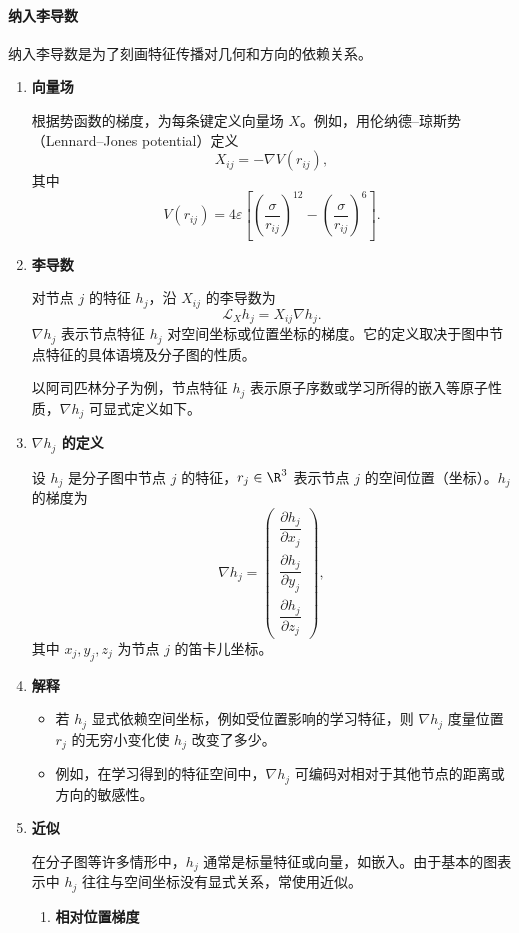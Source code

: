 \paragraph{纳入李导数}
纳入李导数是为了刻画特征传播对几何和方向的依赖关系。
\begin{enumerate}[label=\alph*.]
  \item \textbf{向量场}

  根据势函数的梯度，为每条键定义向量场 $X$。例如，用伦纳德–琼斯势（Lennard–Jones potential）定义
  \[
    X_{ij}=-\nabla V(r_{ij}),
  \]
  其中
  \[
    V(r_{ij})=4\varepsilon
      \left[\left(\frac{\sigma}{r_{ij}}\right)^{12}
            -\left(\frac{\sigma}{r_{ij}}\right)^6\right].
  \]

  \item \textbf{李导数}

  对节点 $j$ 的特征 $h_j$，沿 $X_{ij}$ 的李导数为
  \[
    \mathcal L_X h_j=X_{ij}\nabla h_j.
  \]
  $\nabla h_j$ 表示节点特征 $h_j$ 对空间坐标或位置坐标的梯度。它的定义取决于图中节点特征的具体语境及分子图的性质。

  以阿司匹林分子为例，节点特征 $h_j$ 表示原子序数或学习所得的嵌入等原子性质，$\nabla h_j$ 可显式定义如下。

  \item \textbf{$\nabla h_j$ 的定义}

  设 $h_j$ 是分子图中节点 $j$ 的特征，$r_j\in\R^3$ 表示节点 $j$ 的空间位置（坐标）。$h_j$ 的梯度为
  \[
    \nabla h_j=
       \begin{pmatrix}
         \dfrac{\partial h_j}{\partial x_j}\\[4pt]
         \dfrac{\partial h_j}{\partial y_j}\\[4pt]
         \dfrac{\partial h_j}{\partial z_j}
       \end{pmatrix},
  \]
  其中 $x_j,y_j,z_j$ 为节点 $j$ 的笛卡儿坐标。
  \item \textbf{解释}
  \begin{itemize}
    \item 若 $h_j$ 显式依赖空间坐标，例如受位置影响的学习特征，则 $\nabla h_j$ 度量位置 $r_j$ 的无穷小变化使 $h_j$ 改变了多少。
    \item 例如，在学习得到的特征空间中，$\nabla h_j$ 可编码对相对于其他节点的距离或方向的敏感性。
  \end{itemize}
  \item \textbf{近似}

  在分子图等许多情形中，$h_j$ 通常是标量特征或向量，如嵌入。由于基本的图表示中 $h_j$ 往往与空间坐标没有显式关系，常使用近似。
  \begin{enumerate}[label=\arabic*.]
    \item \textbf{相对位置梯度}


\end{enumerate}
\end{enumerate}
